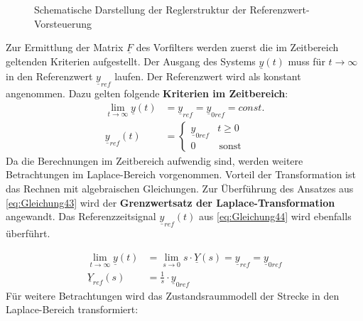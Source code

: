 \begin{figure}[H]
    \centering
    \caption[Reglerstruktur Vorsteuerung]{Schematische Darstellung der Reglerstruktur der Referenzwert-Vorsteuerung}
    \label{fig:Bild9}
\end{figure}

Zur Ermittlung der Matrix $\underline{F}$ des Vorfilters werden zuerst die im Zeitbereich geltenden Kriterien aufgestellt. Der Ausgang des Systems $\underline{y}(t)$ muss für $t \to \infty$ in den Referenzwert $\underline{y}_{ref}$ laufen. Der Referenzwert wird als konstant angenommen. Dazu gelten folgende \textbf{Kriterien im Zeitbereich}:
\begin{align}
    \lim_{t \to \infty} \underline{y}(t) &= \underline{y}_{ref} = \underline{y}_{0ref} = const. \label{eq:Gleichung43}\\
    \underline{y}_{ref}(t) &=
    \begin{cases}
        \underline{y}_{0ref} & t \geq 0 \\
        0 & \, \text{sonst}
    \end{cases} \label{eq:Gleichung44}
\end{align}
\newline
Da die Berechnungen im Zeitbereich aufwendig sind, werden weitere Betrachtungen im Laplace-Bereich vorgenommen. Vorteil der Transformation ist das Rechnen mit algebraischen Gleichungen. Zur Überführung des Ansatzes aus \autoref{eq:Gleichung43} wird der \textbf{Grenzwertsatz der Laplace-Transformation} angewandt. Das Referenzzeitsignal $\underline{y}_{ref}(t)$ aus \autoref{eq:Gleichung44} wird ebenfalls überführt.

\begin{align}
    \lim_{t \to \infty} \underline{y}(t) &= \lim_{s \to 0} s\cdot\underline{Y}(s) = \underline{y}_{ref} = \underline{y}_{0ref} \label{eq:Gleichung45}\\
    \underline{Y}_{ref}(s) &= \frac{1}{s}\cdot\underline{y}_{0ref} \label{eq:Gleichung46}
\end{align}
\newline
Für weitere Betrachtungen wird das Zustandsraummodell der Strecke in den Laplace-Bereich transformiert:

